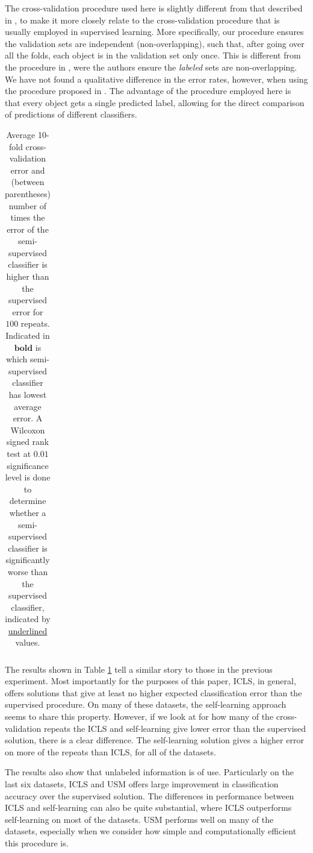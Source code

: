 \documentclass{elsarticle}
\begin{document}
The cross-validation procedure used here is slightly different from that described in \cite{Chapelle2006}, to make it more closely relate to the cross-validation procedure that is usually employed in supervised learning. More specifically, our procedure ensures the validation sets are independent (non-overlapping), such that, after going over all the folds, each object is in the validation set only once. This is different from the procedure in \cite{Chapelle2006}, were the authors ensure the \emph{labeled} sets are non-overlapping. We have not found a qualitative difference in the error rates, however, when using the procedure proposed in \cite{Chapelle2006}. The advantage of the procedure employed here is that every object gets a single predicted label, allowing for the direct comparison of predictions of different classifiers.

\begin{table}[t]
\caption{Average 10-fold cross-validation error and (between parentheses) number of times the error of the semi-supervised classifier is higher than the supervised error for $100$ repeats. Indicated in $\mathbf{bold}$ is which semi-supervised classifier has lowest average error. A Wilcoxon signed rank test at $0.01$ significance level is done to determine whether a semi-supervised classifier is significantly worse than the supervised classifier, indicated by \underline{underlined} values.} \label{table:cvresults}
\centering
\begin{tabular}{llllll}
  \hline
  
   \hline
\end{tabular}
\end{table}

The results shown in Table \ref{table:cvresults} tell a similar story to those in the previous experiment. Most importantly for the purposes of this paper, ICLS, in general, offers solutions that give at least no higher expected classification error than the supervised procedure. 
On many of these datasets, the self-learning approach seems to share this property. However, if we look at for how many of the cross-validation repeats the ICLS and self-learning give lower error than the supervised solution, there is a clear difference. The self-learning solution gives a higher error on more of the repeats than ICLS, for all of the datasets.

The results also show that unlabeled information is of use. Particularly on the last six datasets, ICLS and USM offers large improvement in classification accuracy over the supervised solution. The differences in performance between ICLS and self-learning can also be quite substantial, where ICLS outperforms self-learning on most of the datasets.
USM performs well on many of the datasets, especially when we consider how simple and computationally efficient this procedure is. 
\end{document}
